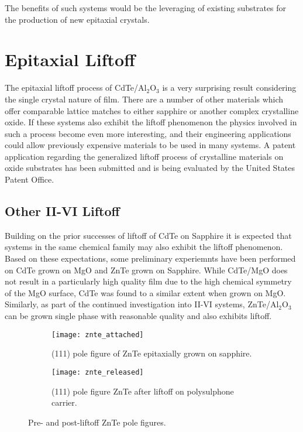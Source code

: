 The benefits of such systems would be the leveraging of existing substrates for the production of new epitaxial crystals.

\section{Epitaxial Liftoff}
The epitaxial liftoff process of CdTe/Al\(_2\)O\(_3\) is a very surprising result considering the single crystal nature of film.
There are a number of other materials which offer comparable lattice matches to either sapphire or another complex crystalline oxide.
If these systems also exhibit the liftoff phenomenon the physics involved in such a process become even more interesting, and their engineering applications could allow previously expensive materials to be used in many systems.
A patent application regarding the generalized liftoff process of crystalline materials on oxide substrates has been submitted and is being evaluated by the United States Patent Office.

\subsection{Other II-VI Liftoff} Building on the prior successes of liftoff of CdTe on Sapphire it is expected that systems in the same chemical family may also exhibit the liftoff phenomenon.
Based on these expectations, some preliminary experiemnts have been performed on CdTe grown on MgO and ZnTe grown on Sapphire.
While CdTe/MgO does not result in a particularly high quality film due to the high chemical symmetry of the MgO surface, CdTe was found to a similar extent when grown on MgO\@. Similarly, as part of the continued investigation into II-VI systems, ZnTe/Al\(_2\)O\(_3\) can be grown single phase with reasonable quality and also exhibits liftoff.
\begin{figure}
 \centering
 \begin{subfigure}[t]{0.47\textwidth}
  \centering \texttt{[image: znte\_attached]}
  \caption{\label{fig:znte_attached}(111) pole figure of ZnTe epitaxially grown on sapphire.}
 \end{subfigure}\quad%
 \begin{subfigure}[t]{0.47\textwidth}
  \centering \texttt{[image: znte\_released]}
  \caption{\label{fig:znte_released}(111) pole figure ZnTe after liftoff on polysulphone carrier.}
 \end{subfigure}
 \caption{\label{fig:znte_liftoff}Pre- and post-liftoff ZnTe pole figures.}
\end{figure}

